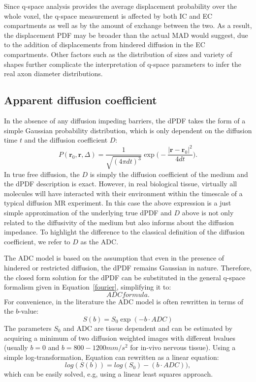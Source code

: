 Since q-space analysis provides the average displacement probability over the whole voxel, the q-space measurement is affected by both IC and EC compartments as well as by the amount of exchange between the two. As a result, the displacement PDF may be broader than the actual MAD would suggest, due to the addition of displacements from hindered diffusion in the EC compartments. Other factors such as the distribution of sizes and variety of shapes further complicate the interpretation of q-space parameters to infer the real axon diameter distributions. 

\subsection{Apparent diffusion coefficient}
\label{subsec:adc}
In the absence of any diffusion impeding barriers, the dPDF takes the form of a simple Gaussian probability distribution, which is only dependent on the diffusion time $t$ and the diffusion coefficient $D$:
\begin{equation}
P(\textbf{r}_{0},\textbf{r},\Delta) =  \frac{1}{\sqrt{(4\pi dt)^3}}\exp\bigg(-\frac{|\textbf{r}-\textbf{r}_{0}|^{2}}{4dt}\bigg).
\label{Gaussian PDF}
\end{equation}
In true free diffusion, the $D$ is simply the diffusion coefficient of the medium and the dPDF description is exact. However, in real biological tissue, virtually all molecules will have interacted with their environment within the timescale of a typical diffusion MR experiment. In this case the above expression is a just simple approximation of the underlying true dPDF and $D$ above is not only related to the diffusivity of the medium but also informs about the diffusion impedance. To highlight the difference to the classical definition of the diffusion coefficient, we refer to $D$ as the \gls{ADC}.

The \gls{ADC} model is based on the assumption that even in the presence of hindered or restricted diffusion, the dPDF remains Gaussian in nature. Therefore, the closed form solution for the dPDF can be substituted in the general q-space formalism given in Equation~\ref{fourier}, simplifying it to:
\begin{equation}
	ADC formula.
\end{equation}
For convenience, in the literature the ADC model is often rewritten in terms of the $b$-value:
\begin{equation}
	S(b) = S_{0}\exp(-b\cdot ADC)
    \label{eq:chapter 2 adc}
\end{equation}
The parameters $S_0$ and \gls{ADC} are tissue dependent and can be estimated by acquiring a minimum of two diffusion weighted images with different {\glspl{bvalue}} (usually $b=0$ and $b=800-1200mm/s^2$ for in-vivo nervous tissue). Using a simple log-transformation, Equation \label{eq:chapter 2 adc} can rewritten as a linear equation:
\begin{equation}
	log(S(b)) = log(S_{0}) - (b\cdot ADC)),
    \label{eq:chapter 2 adc}
\end{equation}
which can be easily solved, e.g, using a linear least squares approach.

